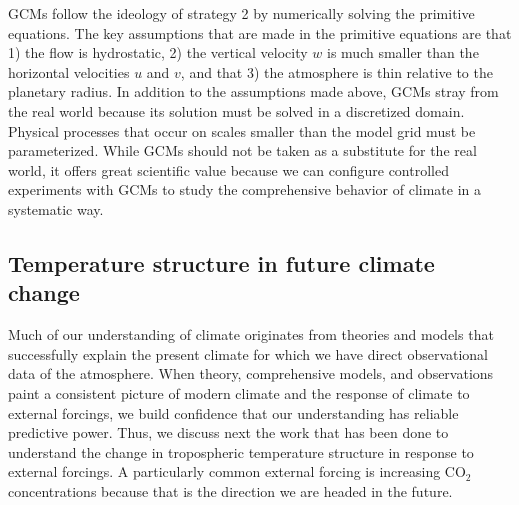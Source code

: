 \documentclass{article}
\begin{document}
GCMs follow the ideology of strategy 2 by numerically solving the primitive equations. The key assumptions that are made in the primitive equations are that 1) the flow is hydrostatic, 2) the vertical velocity $w$ is much smaller than the horizontal velocities $u$ and $v$, and that 3) the atmosphere is thin relative to the planetary radius. In addition to the assumptions made above, GCMs stray from the real world because its solution must be solved in a discretized domain. Physical processes that occur on scales smaller than the model grid must be parameterized. While GCMs should not be taken as a substitute for the real world, it offers great scientific value because we can configure controlled experiments with GCMs to study the comprehensive behavior of climate in a systematic way. 

\subsection{Temperature structure in future climate change}

Much of our understanding of climate originates from theories and models that successfully explain the present climate for which we have direct observational data of the atmosphere. When theory, comprehensive models, and observations paint a consistent picture of modern climate and the response of climate to external forcings, we build confidence that our understanding has reliable predictive power. Thus, we discuss next the work that has been done to understand the change in tropospheric temperature structure in response to external forcings. A particularly common external forcing is increasing CO$_2$ concentrations because that is the direction we are headed in the future.
\end{document}
